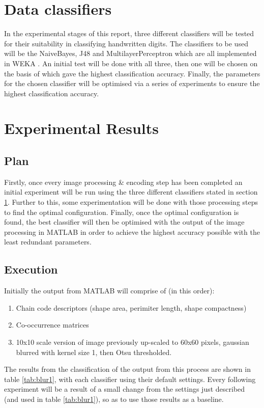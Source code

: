 \documentclass[12pt]{article}
\begin{document}
\section{Data classifiers} \label{classifiers}
  In the experimental stages of this report, three different classifiers will be tested for their suitability in classifying handwritten digits. The classifiers to be used will be the NaiveBayes, J48 and MultilayerPerceptron which are all implemented in WEKA \citep{hall2009weka}. An initial test will be done with all three, then one will be chosen on the basis of which gave the highest classification accuracy. Finally, the parameters for the chosen classifier will be optimised via a series of experiments to ensure the highest classification accuracy.

\section{Experimental Results}
  \subsection{Plan}
    Firstly, once every image processing \& encoding step has been completed an initial experiment will be run using the three different classifiers stated in section \ref{classifiers}. Further to this, some experimentation will be done with those processing steps to find the optimal configuration. Finally, once the optimal configuration is found, the best classifier will then be optimised with the output of the image processing in MATLAB in order to achieve the highest accuracy possible with the least redundant parameters.

  \subsection{Execution}
    Initially the output from MATLAB will comprise of (in this order):
    \begin{enumerate}
      \item Chain code descriptors (shape area, perimiter length, shape compactness)
      \item Co-occurrence matrices
      \item 10x10 scale version of image previously up-scaled to 60x60 pixels, gaussian blurred with kernel size 1, then Otsu thresholded.
    \end{enumerate}
    The results from the classification of the output from this process are shown in table \ref{tab:blur1}, with each classifier using their default settings. Every following experiment will be a result of a small change from the settings just described (and used in table \ref{tab:blur1}), so as to use those results as a baseline.
\end{document}
